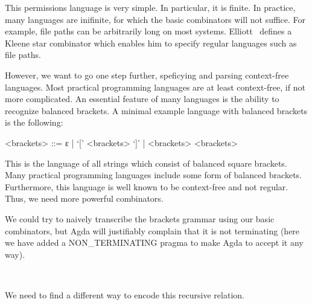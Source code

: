 This permissions language is very simple. In particular, it is finite. In practice, many languages are inifinite, for which the basic combinators will not suffice. For example, file paths can be arbitrarily long on most systems.
Elliott~\cite{conal-languages} defines a Kleene star combinator which enables him to specify regular languages such as file paths.

However, we want to go one step further, speficying and parsing context-free languages. Most practical programming languages are at least context-free, if not more complicated. An essential feature of many languages is the ability to recognize balanced brackets. A minimal example language with balanced brackets is the following:
%
\begin{grammar}
<brackets> ::= ε | `[' <brackets> `]' | <brackets> <brackets>
\end{grammar}
%
This is the language of all strings which consist of balanced square brackets. 
Many practical programming languages include some form of balanced brackets. Furthermore, this language is well known to be context-free and not regular. Thus, we need more powerful combinators.

We could try to naively transcribe the brackets grammar using our basic combinators, but Agda will justifiably complain that it is not terminating (here we have added a NON_TERMINATING pragma to make Agda to accept it any way).
%
\begin{code}%
%
\>[4]\AgdaSymbol{\{-\#}\AgdaSpace{}%
\AgdaSpace{}%
\AgdaSymbol{\#-\}}\<%
\\
%
\>[4]\AgdaSpace{}%
\AgdaSymbol{=}\AgdaSpace{}%
\AgdaSpace{}%
\AgdaSpace{}%
\AgdaSpace{}%
\AgdaString{'['}\AgdaSpace{}%
\AgdaSpace{}%
\AgdaSpace{}%
\AgdaSpace{}%
\AgdaSpace{}%
\AgdaString{']'}\AgdaSpace{}%
\AgdaSpace{}%
\AgdaSpace{}%
\AgdaSpace{}%
\<%
\end{code}
%
We need to find a different way to encode this recursive relation.

